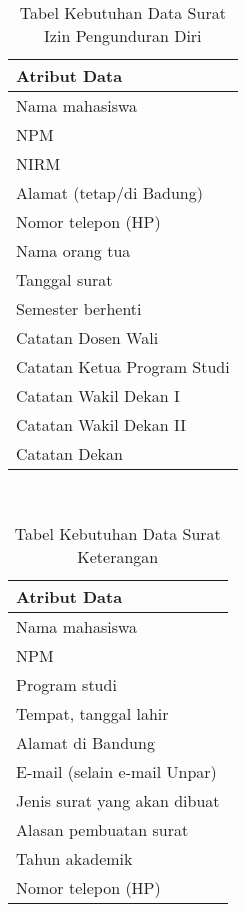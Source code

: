 \begin{table}[H]
\centering
\caption{Tabel Kebutuhan Data Surat Izin Pengunduran Diri}
\label{surat_izin_pengunduran_diri}
\begin{tabular}{|l|}
\hline
{\textbf{Atribut Data}}                     \\ \hline
{Nama mahasiswa}                            \\ \hline 
{NPM}                                       \\ \hline 
{NIRM}                                      \\ \hline 
{Alamat (tetap/di Badung)}                  \\ \hline 
{Nomor telepon (HP)}                        \\ \hline 
{Nama orang tua}                            \\ \hline 
{Tanggal surat}                             \\ \hline 
{Semester berhenti}                         \\ \hline 
{Catatan Dosen Wali}                        \\ \hline 
{Catatan Ketua Program Studi}               \\ \hline 
{Catatan Wakil Dekan I}                     \\ \hline 
{Catatan Wakil Dekan II}                    \\ \hline 
{Catatan Dekan}                             \\ \hline
\end{tabular}
\end{table}
\
\begin{table}[H]
\centering
\caption{Tabel Kebutuhan Data Surat Keterangan}
\label{surat_keterangan}
\begin{tabular}{|l|}
\hline
{\textbf{Atribut Data}}                     \\ \hline
{Nama mahasiswa}                            \\ \hline 
{NPM}                                       \\ \hline 
{Program studi}                             \\ \hline 
{Tempat, tanggal lahir}                     \\ \hline 
{Alamat di Bandung}                         \\ \hline 
{E-mail (selain e-mail Unpar)}               \\ \hline 
{Jenis surat yang akan dibuat}              \\ \hline 
{Alasan pembuatan surat}                    \\ \hline 
{Tahun akademik}                            \\ \hline 
{Nomor telepon (HP)}                        \\ \hline

\end{tabular}
\end{table}
